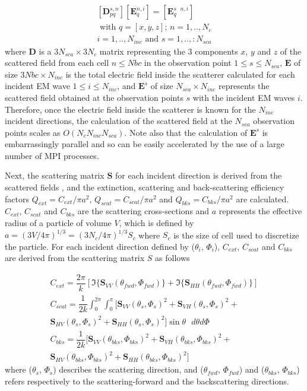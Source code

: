 \documentclass{article}
\begin{document}
\begin{gather}
	\label{EQ_VIEM_scat_matrix}
	[\textbf{D}_{pq}^{s,n}][\textbf{E}_q^{n,i}] = [\textbf{E}_q^{s\textbf{ } n,i}] \\  
	\text{ with } q=[x,y,z]\text{; } n=1,..,N_c \nonumber \\
	i=1,..,N_{inc}\text{ and } s=1,..,:N_{sca} \nonumber
\end{gather}
where $\textbf{D}$ is a $3N_{sca} \times 3N_c$ matrix representing the $3$ components $x$, $y$ and $z$ of the scattered field from each cell $n \leq Nbc$ in the observation point $1 \leq s \leq N_{sca}$, $\textbf{E}$ of size $3Nbc \times N_{inc}$ is the total electric field inside the scatterer calculated for each incident EM wave $1 \leq i \leq N_{inc}$, and $\textbf{E}^s$ of size $N_{sca} \times N_{inc}$ represents the scattered field obtained at the observation points $s$ with the incident EM waves $i$. Therefore, once the electric field inside the scatterer is known for the $N_{inc}$ incident directions, the calculation of the scattered field at the $N_{sca}$ observation points scales as $O(N_c  N_{inc}N_{sca})$. Note also that the calculation of $\textbf{E}^s$ is embarrassingly parallel and so can be easily accelerated by the use of a large number of MPI processes. 

Next, the scattering matrix $\textbf{S}$ for each incident direction is derived from the scattered fields \cite{mishchenko2002scattering}, and the extinction, scattering and back-scattering efficiency factors $Q_{ext} = C_{ext}/\pi a^2$, $Q_{scat}=C_{scat}/\pi a^2$ and $Q_{bks}=C_{bks} /\pi a^2$ are calculated. $C_{ext}$, $C_{scat}$ and $C_{bks}$ are the scattering cross-sections and $a$ represents the effective radius of a particle of volume $V$, which is defined by $a = (3V/4\pi)^{1/3} = (3N_c/4\pi)^{1/3}S_c$ where $S_c$ is the size of cell used to discretize the particle. For each incident direction defined by ($\theta_i$, $\Phi_i$), $C_{ext}$, $C_{scat}$ and $C_{bks}$ are derived from the scattering matrix $S$ as follows \cite{mishchenko2002scattering}

\begin{gather}
	C_{ext} = \dfrac{2\pi}{k} [\Im\{\textbf{S}_{VV}(\theta_{fwd},\Phi_{fwd})\} + \Im\{\textbf{S}_{HH}(\theta_{fwd},\Phi_{fwd})\}] \\
	C_{scat} = \dfrac{1}{2k}\int_0^{2\pi}\int_0^{\pi}[\textbf{S}_{VV}(\theta_s,\Phi_s)^2+\textbf{S}_{VH}(\theta_s,\Phi_s)^2+ \nonumber\\
	\textbf{S}_{HV}(\theta_s,\Phi_s)^2+\textbf{S}_{HH}(\theta_s,\Phi_s)^2]\sin\theta \text{ } d\theta d\Phi \\
	C_{bks} = \dfrac{1}{2k} [\textbf{S}_{VV}(\theta_{bks},\Phi_{bks})^2+\textbf{S}_{VH}(\theta_{bks},\Phi_{bks})^2+ \nonumber 
	\\\textbf{S}_{HV}(\theta_{bks},\Phi_{bks})^2+\textbf{S}_{HH}(\theta_{bks},\Phi_{bks})^2]
\end{gather}
where ($\theta_s$, $\Phi_s$) describes the scattering direction, and ($\theta_{fwd}$, $\Phi_{fwd}$) and ($\theta_{bks}$, $\Phi_{bks}$) refers respectively to the scattering-forward and the backscattering directions.
\end{document}
